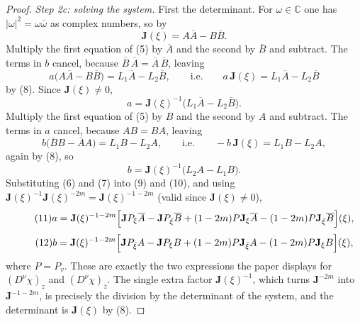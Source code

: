 \begin{proof}
\emph{Step 2c: solving the system.}  First the determinant.  For
$\omega\in\mathbb{C}$ one has $|\omega|^2=\omega\bar\omega$ as complex numbers,
so by 
\begin{equation}\tag{8}
  \mathbf{J}(\xi)=A\overline{A}-B\overline{B}.
\end{equation}
Multiply the first equation of (5) by $\overline{A}$ and the second by
$\overline{B}$ and subtract.  The terms in $b$ cancel, because
$\overline{B}\,\overline{A}=\overline{A}\,\overline{B}$, leaving
\[
  a\bigl(A\overline{A}-B\overline{B}\bigr)=L_1\overline{A}-L_2\overline{B},
  \qquad\text{i.e.}\qquad
  a\,\mathbf{J}(\xi)=L_1\overline{A}-L_2\overline{B}
\]
by (8).  Since $\mathbf{J}(\xi)\neq0$,
\begin{equation}\tag{9}
  a=\mathbf{J}(\xi)^{-1}\bigl(L_1\overline{A}-L_2\overline{B}\bigr).
\end{equation}
Multiply the first equation of (5) by $B$ and the second by $A$ and subtract.
The terms in $a$ cancel, because $AB=BA$, leaving
\[
  b\bigl(\overline{B}B-\overline{A}A\bigr)=L_1B-L_2A,
  \qquad\text{i.e.}\qquad
  -b\,\mathbf{J}(\xi)=L_1B-L_2A ,
\]
again by (8), so
\begin{equation}\tag{10}
  b=\mathbf{J}(\xi)^{-1}\bigl(L_2A-L_1B\bigr).
\end{equation}
Substituting (6) and (7) into (9) and (10), and using
$\mathbf{J}(\xi)^{-1}\mathbf{J}(\xi)^{-2m}=\mathbf{J}(\xi)^{-1-2m}$ (valid
since $\mathbf{J}(\xi)\neq0$),
\begin{equation}\tag{11}
  a=\mathbf{J}(\xi)^{-1-2m}\Bigl[\mathbf{J}P_\xi\overline{A}-\mathbf{J}P_{\bar\xi}\overline{B}
     +(1-2m)P\mathbf{J}_\xi\overline{A}-(1-2m)P\mathbf{J}_{\bar\xi}\overline{B}\Bigr](\xi),
\end{equation}
\begin{equation}\tag{12}
  b=\mathbf{J}(\xi)^{-1-2m}\Bigl[\mathbf{J}P_{\bar\xi}A-\mathbf{J}P_\xi B
     +(1-2m)P\mathbf{J}_{\bar\xi}A-(1-2m)P\mathbf{J}_\xi B\Bigr](\xi),
\end{equation}
where $P=P_v$.  These are exactly the two expressions the paper displays for
$(D^\nu\chi)_z$ and $(D^\nu\chi)_{\bar z}$.  The single extra factor
$\mathbf{J}(\xi)^{-1}$, which turns $\mathbf{J}^{-2m}$ into
$\mathbf{J}^{-1-2m}$, is precisely the division by the determinant of the
system, and the determinant is $\mathbf{J}(\xi)$ by (8).


\end{proof}
